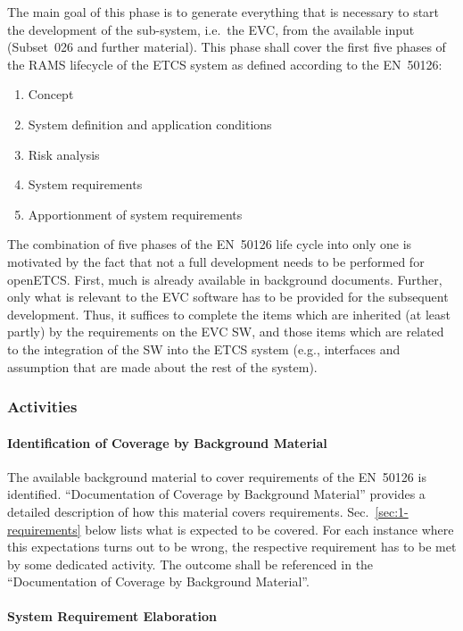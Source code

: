 \documentclass{template/openetcs_article}
\begin{document}
The main goal of this phase is to generate everything that is
necessary to start the development of the sub-system, i.e.\ the EVC,
from the available input (Subset~026 and further material). This phase
shall cover the first five phases of the RAMS lifecycle of the ETCS
system as defined according to the EN~50126:
\begin{enumerate}
\item Concept
\item System definition and application conditions
\item Risk analysis
\item System requirements
\item Apportionment of system requirements
\end{enumerate}
The combination of five phases of the EN~50126 life cycle into only
one is motivated by the fact that not a full development needs to be
performed for openETCS. First, much is already available in background
documents. Further, only what is relevant to the EVC software has to
be provided for the subsequent development. Thus, it suffices to
complete the items which are inherited (at least partly) by the
requirements on the EVC SW, and those items which are related to the
integration of the SW into the ETCS system (e.g., interfaces and
assumption that are made about the rest of the system).


\subsubsection{Activities}
\label{sec:1-activities}

\paragraph{Identification of Coverage by Background Material}
\label{sec:1-a-0}

The available background material to cover requirements of the
EN~50126 is identified. ``Documentation of Coverage by Background
Material'' provides a detailed description of how this material covers
requirements. Sec.~\ref{sec:1-requirements} below lists what is
expected to be covered. For each instance where this expectations
turns out to be wrong, the respective requirement has to be met by
some dedicated activity. The outcome shall be referenced in the
``Documentation of Coverage by Background Material''.

\paragraph{System Requirement Elaboration}
\label{sec:1-a-1}
\end{document}
